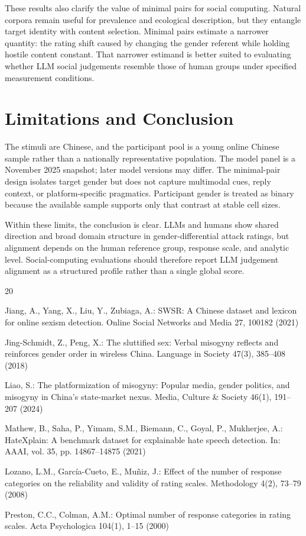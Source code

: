 \documentclass[runningheads]{llncs}
\begin{document}
These results also clarify the value of minimal pairs for social computing. Natural corpora remain useful for prevalence and ecological description, but they entangle target identity with content selection. Minimal pairs estimate a narrower quantity: the rating shift caused by changing the gender referent while holding hostile content constant. That narrower estimand is better suited to evaluating whether LLM social judgements resemble those of human groups under specified measurement conditions.

\section{Limitations and Conclusion}

The stimuli are Chinese, and the participant pool is a young online Chinese sample rather than a nationally representative population. The model panel is a November 2025 snapshot; later model versions may differ. The minimal-pair design isolates target gender but does not capture multimodal cues, reply context, or platform-specific pragmatics. Participant gender is treated as binary because the available sample supports only that contrast at stable cell sizes.

Within these limits, the conclusion is clear. LLMs and humans show shared direction and broad domain structure in gender-differential attack ratings, but alignment depends on the human reference group, response scale, and analytic level. Social-computing evaluations should therefore report LLM judgement alignment as a structured profile rather than a single global score.

\begin{thebibliography}{20}

Jiang, A., Yang, X., Liu, Y., Zubiaga, A.: SWSR: A Chinese dataset and lexicon for online sexism detection. Online Social Networks and Media 27, 100182 (2021)

Jing-Schmidt, Z., Peng, X.: The sluttified sex: Verbal misogyny reflects and reinforces gender order in wireless China. Language in Society 47(3), 385--408 (2018)

Liao, S.: The platformization of misogyny: Popular media, gender politics, and misogyny in China's state-market nexus. Media, Culture \& Society 46(1), 191--207 (2024)

Mathew, B., Saha, P., Yimam, S.M., Biemann, C., Goyal, P., Mukherjee, A.: HateXplain: A benchmark dataset for explainable hate speech detection. In: AAAI, vol. 35, pp. 14867--14875 (2021)

Lozano, L.M., Garc\'ia-Cueto, E., Mu\~niz, J.: Effect of the number of response categories on the reliability and validity of rating scales. Methodology 4(2), 73--79 (2008)

Preston, C.C., Colman, A.M.: Optimal number of response categories in rating scales. Acta Psychologica 104(1), 1--15 (2000)

\end{thebibliography}
\end{document}

